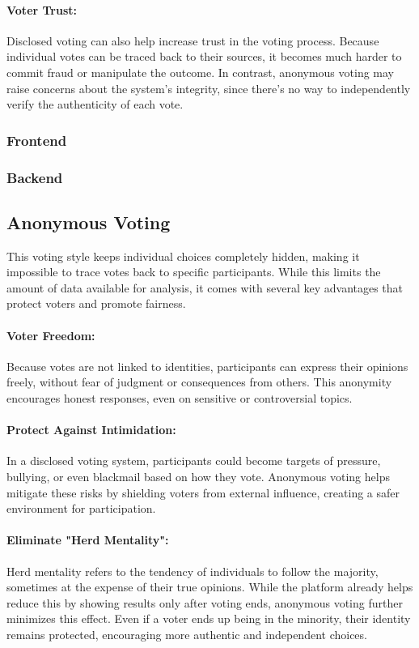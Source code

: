 \documentclass[a4paper,12pt]{report}
\begin{document}
\paragraph{Voter Trust:}
Disclosed voting can also help increase trust in the voting process. Because individual votes can be traced back to their sources, it becomes much harder to commit fraud or manipulate the outcome. In contrast, anonymous voting may raise concerns about the system’s integrity, since there’s no way to independently verify the authenticity of each vote. \parencite{disvsanon}
\subsubsection{Frontend}
\subsubsection{Backend}
\subsection{Anonymous Voting}
This voting style keeps individual choices completely hidden, making it impossible to trace votes back to specific participants. While this limits the amount of data available for analysis, it comes with several key advantages that protect voters and promote fairness.
\paragraph{Voter Freedom:}
Because votes are not linked to identities, participants can express their opinions freely, without fear of judgment or consequences from others. This anonymity encourages honest responses, even on sensitive or controversial topics.
\paragraph{Protect Against Intimidation:}
In a disclosed voting system, participants could become targets of pressure, bullying, or even blackmail based on how they vote. Anonymous voting helps mitigate these risks by shielding voters from external influence, creating a safer environment for participation.
\paragraph{Eliminate "Herd Mentality":}
Herd mentality refers to the tendency of individuals to follow the majority, sometimes at the expense of their true opinions. While the platform already helps reduce this by showing results only after voting ends, anonymous voting further minimizes this effect. Even if a voter ends up being in the minority, their identity remains protected, encouraging more authentic and independent choices.  \parencite{disvsanon}
\end{document}
